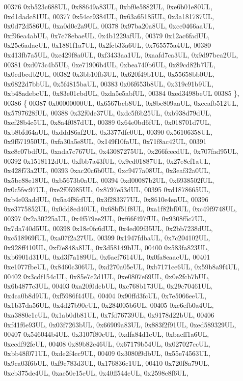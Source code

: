 \begin{DoxyCode}
00376     0xb523c688UL, 0x88649a83UL, 0xbf0e5882UL, 0xe6b01e80UL, 0xd1dadc81UL,
00377     0x54cc9384UL, 0x63a65185UL, 0x3a181787UL, 0x0d72d586UL, 0xa0d0e2a9UL,
00378     0x97ba20a8UL, 0xce0466aaUL, 0xf96ea4abUL, 0x7c78ebaeUL, 0x4b1229afUL,
00379     0x12ac6fadUL, 0x25c6adacUL, 0x1881f1a7UL, 0x2feb33a6UL, 0x765575a4UL,
00380     0x413fb7a5UL, 0xc429f8a0UL, 0xf3433aa1UL, 0xaafd7ca3UL, 0x9d97bea2UL,
00381     0xd073c4b5UL, 0xe71906b4UL, 0xbea740b6UL, 0x89cd82b7UL, 0x0cdbcdb2UL,
00382     0x3bb10fb3UL, 0x620f49b1UL, 0x55658bb0UL, 0x6822d7bbUL, 0x5f4815baUL,
00383     0x06f653b8UL, 0x319c91b9UL, 0xb48adebcUL, 0x83e01cbdUL, 0xda5e5abfUL,
00384     0xed3498beUL
00385   \},
00386   \{
00387     0x00000000UL, 0x6567bcb8UL, 0x8bc809aaUL, 0xeeafb512UL, 0x5797628fUL,
00388     0x32f0de37UL, 0xdc5f6b25UL, 0xb938d79dUL, 0xef28b4c5UL, 0x8a4f087dUL,
00389     0x64e0bd6fUL, 0x018701d7UL, 0xb8bfd64aUL, 0xddd86af2UL, 0x3377dfe0UL,
00390     0x56106358UL, 0x9f571950UL, 0xfa30a5e8UL, 0x149f10faUL, 0x71f8ac42UL,
00391     0xc8c07bdfUL, 0xada7c767UL, 0x43087275UL, 0x266fcecdUL, 0x707fad95UL,
00392     0x1518112dUL, 0xfbb7a43fUL, 0x9ed01887UL, 0x27e8cf1aUL, 0x428f73a2UL,
00393     0xac20c6b0UL, 0xc9477a08UL, 0x3eaf32a0UL, 0x5bc88e18UL, 0xb5673b0aUL,
00394     0xd00087b2UL, 0x6938502fUL, 0x0c5fec97UL, 0xe2f05985UL, 0x8797e53dUL,
00395     0xd1878665UL, 0xb4e03addUL, 0x5a4f8fcfUL, 0x3f283377UL, 0x8610e4eaUL,
00396     0xe3775852UL, 0x0dd8ed40UL, 0x68bf51f8UL, 0xa1f82bf0UL, 0xc49f9748UL,
00397     0x2a30225aUL, 0x4f579ee2UL, 0xf66f497fUL, 0x9308f5c7UL, 0x7da740d5UL,
00398     0x18c0fc6dUL, 0x4ed09f35UL, 0x2bb7238dUL, 0xc518969fUL, 0xa07f2a27UL,
00399     0x1947fdbaUL, 0x7c204102UL, 0x928ff410UL, 0xf7e848a8UL, 0x3d58149bUL,
00400     0x583fa823UL, 0xb6901d31UL, 0xd3f7a189UL, 0x6acf7614UL, 0x0fa8caacUL,
00401     0xe1077fbeUL, 0x8460c306UL, 0xd270a05eUL, 0xb7171ce6UL, 0x59b8a9f4UL,
00402     0x3cdf154cUL, 0x85e7c2d1UL, 0xe0807e69UL, 0x0e2fcb7bUL, 0x6b4877c3UL,
00403     0xa20f0dcbUL, 0xc768b173UL, 0x29c70461UL, 0x4ca0b8d9UL, 0xf5986f44UL,
00404     0x90ffd3fcUL, 0x7e5066eeUL, 0x1b37da56UL, 0x4d27b90eUL, 0x284005b6UL,
00405     0xc6efb0a4UL, 0xa3880c1cUL, 0x1ab0db81UL, 0x7fd76739UL, 0x9178d22bUL,
00406     0xf41f6e93UL, 0x03f7263bUL, 0x66909a83UL, 0x883f2f91UL, 0xed589329UL,
00407     0x546044b4UL, 0x3107f80cUL, 0xdfa84d1eUL, 0xbacff1a6UL, 0xecdf92feUL,
00408     0x89b82e46UL, 0x67179b54UL, 0x027027ecUL, 0xbb48f071UL, 0xde2f4cc9UL,
00409     0x3080f9dbUL, 0x55e74563UL, 0x9ca03f6bUL, 0xf9c783d3UL, 0x176836c1UL,
00410     0x720f8a79UL, 0xcb375de4UL, 0xae50e15cUL, 0x40ff544eUL, 0x2598e8f6UL,

\end{DoxyCode}
